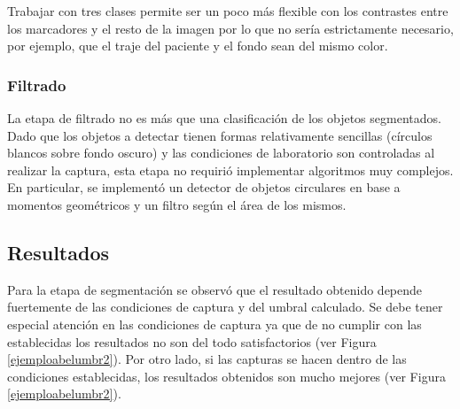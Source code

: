 Trabajar con tres clases permite ser un poco más flexible con los contrastes entre los marcadores y el resto de la imagen por lo que no sería estrictamente necesario, por ejemplo, que el traje del paciente y el fondo sean del mismo color.

\subsubsection{Filtrado}
La etapa de filtrado no es más que una clasificación de los objetos segmentados. Dado que los objetos a detectar tienen formas relativamente sencillas (círculos blancos sobre fondo oscuro) y las condiciones de laboratorio son controladas al realizar la captura, esta etapa no requirió implementar algoritmos muy complejos. En particular, se implementó un detector de objetos circulares en base a momentos geométricos\cite{imageMoments} y un filtro según el área de los mismos.

\subsection{Resultados}
Para la etapa de segmentación se observó que el resultado obtenido depende fuertemente de las condiciones de captura y del umbral calculado. Se debe tener especial atención en las condiciones de captura ya que de no cumplir con las establecidas los resultados no son del todo satisfactorios (ver Figura \ref{ejemploabelumbr2}). Por otro lado, si las capturas se hacen dentro de las condiciones establecidas, los resultados obtenidos son mucho mejores (ver Figura \ref{ejemploabelumbr2}).

